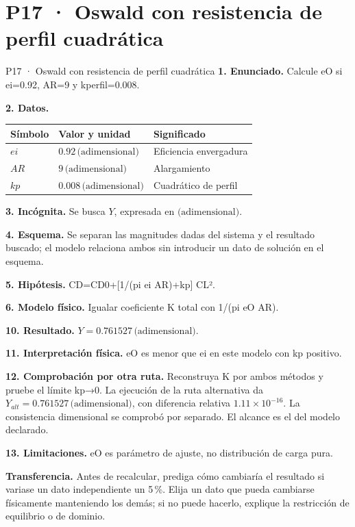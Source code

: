 \chapter*{P17 · Oswald con resistencia de perfil cuadrática}
\begin{studiumworked}{P17 · Oswald con resistencia de perfil cuadrática}
\textbf{1. Enunciado.} Calcule eO si ei=0.92, AR=9 y kperfil=0.008.

\textbf{2. Datos.}
\begin{longtable}{p{.16\linewidth}p{.35\linewidth}p{.38\linewidth}}\toprule Símbolo & Valor y unidad & Significado\\\midrule\endhead
$ei$ & $0.92\,\text{(adimensional)}$ & Eficiencia envergadura\\
$AR$ & $9\,\text{(adimensional)}$ & Alargamiento\\
$kp$ & $0.008\,\text{(adimensional)}$ & Cuadrático de perfil\\
\bottomrule\end{longtable}
\textbf{3. Incógnita.} Se busca $Y$, expresada en $\text{(adimensional)}$.

\textbf{4. Esquema.} Se separan las magnitudes dadas del sistema y el resultado buscado; el modelo relaciona ambos sin introducir un dato de solución en el esquema.

\textbf{5. Hipótesis.} CD=CD0+[1/(pi ei AR)+kp] CL².

\textbf{6. Modelo físico.} Igualar coeficiente K total con 1/(pi eO AR).


\textbf{10. Resultado.} $Y=0.761527\,\text{(adimensional)}$.

\textbf{11. Interpretación física.} eO es menor que ei en este modelo con kp positivo.

\textbf{12. Comprobación por otra ruta.} Reconstruya K por ambos métodos y pruebe el límite kp→0. La ejecución de la ruta alternativa da $Y_{alt}=0.761527\,\text{(adimensional)}$, con diferencia relativa $1.11\times10^{-16}$. La consistencia dimensional se comprobó por separado. El alcance es el del modelo declarado.

\textbf{13. Limitaciones.} eO es parámetro de ajuste, no distribución de carga pura.

\textbf{Transferencia.} Antes de recalcular, prediga cómo cambiaría el resultado si variase un dato independiente un 5\,\%. Elija un dato que pueda cambiarse físicamente manteniendo los demás; si no puede hacerlo, explique la restricción de equilibrio o de dominio.\par
\end{studiumworked}
